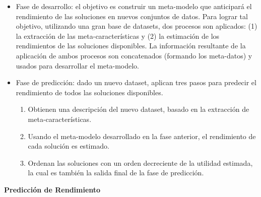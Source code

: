 \begin{itemize}
	\item Fase de desarrollo: el objetivo es construir un meta-modelo que anticipará el rendimiento de las soluciones en nuevos conjuntos de datos. Para lograr tal objetivo, utilizando una gran base de datasets, dos procesos son aplicados: (1) la extracción de las meta-características y (2) la estimación de los rendimientos de las soluciones disponibles. La información resultante de la aplicación de ambos procesos son concatenados (formando los meta-datos) y usados para desarrollar el meta-modelo.
	\item Fase de predicción: dado un nuevo dataset, aplican tres pasos para predecir el rendimiento de todos las soluciones disponibles. \begin{enumerate}
		\item Obtienen una descripción del nuevo dataset, basado en la extracción de meta-características.
		\item Usando el meta-modelo desarrollado en la fase anterior, el rendimiento de cada solución es estimado.
		\item Ordenan las soluciones con un orden decreciente de la utilidad estimada, la cual es también la salida final de la fase de predicción.
	\end{enumerate}
\end{itemize}


%
%

\quad

\textbf{Predicción de Rendimiento}


